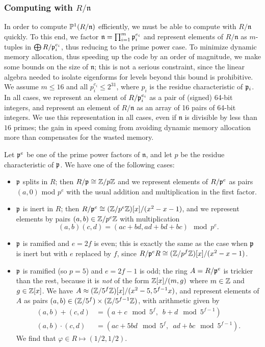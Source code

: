 \documentclass{amsart}
\newcommand{\n}{\mathfrak{n}}
\begin{document}
\subsubsection{Computing with $R/\n$}
In order to compute $\P^1(R/\n)$ efficiently, we must be able to
compute with $R/\n$ quickly.  To this end, we factor $\n =
\prod_{i=1}^m \p_i^{e_i}$ and represent elements of $R/\n$ as
$m$-tuples in $\bigoplus R/\mathfrak{p}_i^{e_i}$, thus reducing to the prime
power case.  To minimize dynamic memory allocation, thus speeding up the
code by an order of magnitude, we make some bounds on the size of
$\n$; this is not a serious constraint, since the linear algebra
needed to isolate eigenforms for levels beyond this bound is
prohibitive.  We assume $m\leq 16$ and all $p_i^{e_i}\leq 2^{31}$,
where $p_i$ is the residue characteristic of $\mathfrak{p}_i$.  In all cases, we represent an
element of $R/\mathfrak{p}_i^{e_i}$ as a pair of (signed) 64-bit integers, and
represent an element of $R/\n$ as an array of 16 pairs of 64-bit
integers. We use this representation in all cases, even if $\n$ is
divisible by less than $16$ primes; the gain in speed coming from
avoiding dynamic memory allocation more than compensates for the
wasted memory.

Let $\mathfrak{p}^e$ be one of the prime power factors of $\n$, and let $p$ be the residue
characteristic of $\mathfrak{p}$. We have one of the following cases:
\begin{itemize}
\item $\mathfrak{p}$ splits in $R$; then $R/\mathfrak{p}\cong \mathbb{Z}/p\mathbb{Z}$ and we represent elements
of $R/\mathfrak{p}^e$ as pairs $(a,0)$ mod $p^e$ with the usual addition and multiplication
in the first factor.
\item $\mathfrak{p}$ is inert in $R$; then $R/\mathfrak{p}^e\cong (\mathbb{Z}/p^e\mathbb{Z})[x]/(x^2-x-1)$,
and we represent elements by pairs $(a,b) \in \mathbb{Z}/p^e\mathbb{Z}$ with multiplication
$$(a,b)(c,d) = (ac+bd,ad+bd+bc) \mod p^e.$$
\item $\mathfrak{p}$ is ramified and $e=2f$ is even; this is exactly the
same as the case when $\mathfrak{p}$ is inert but with $e$ replaced by $f$,
since $R/\mathfrak{p}^eR \cong (\mathbb{Z}/p^{f}\mathbb{Z})[x]/(x^2-x-1)$.
\item $\mathfrak{p}$ is ramified (so $p=5$) and $e=2f-1$ is odd; the ring $A=R/\mathfrak{p}^e$
  is trickier than the rest, because it is {\em not} of the form
  $\mathbb{Z}[x]/(m,g)$ where $m\in\mathbb{Z}$ and $g \in\mathbb{Z}[x]$.  We have $A \approx
  (\mathbb{Z}/5^f\mathbb{Z})[x]/(x^2-5, 5^{f-1}x)$, and represent elements of $A$ as
  pairs $(a,b) \in (\mathbb{Z}/5^f)\times (\mathbb{Z}/5^{f-1}\mathbb{Z})$, with arithmetic
  given by
\begin{align*}
(a,b) + (c,d) &= (a+c \mod 5^f,\,\,\, b+d \mod 5^{f-1})\\
(a,b)\cdot (c,d) &= (ac+5bd \mod 5^f,\,\,\, ad+bc \mod 5^{f-1}).
\end{align*}
 We find that $ \varphi \in R \mapsto (1/2,1/2)$.
\end{itemize}
\end{document}
